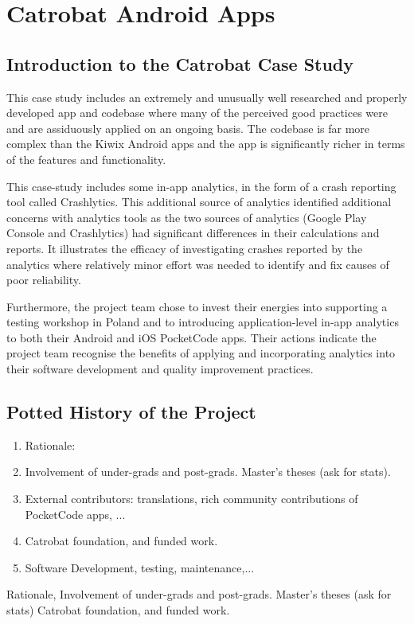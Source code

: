 \section{Catrobat Android Apps}
\subsection{Introduction to the Catrobat Case Study}
This case study includes an extremely and unusually well researched and properly developed app and codebase where many of the perceived good practices were and are assiduously applied on an ongoing basis. The codebase is far more complex than the Kiwix Android apps and the app is significantly richer in terms of the features and functionality.

This case-study includes some in-app analytics, in the form of a crash reporting tool called Crashlytics. This additional source of analytics identified additional concerns with analytics tools as the two sources of analytics (Google Play Console and Crashlytics) had significant differences in their calculations and reports. It illustrates the efficacy of investigating crashes reported by the analytics where relatively minor effort was needed to identify and fix causes of poor reliability.

Furthermore, the project team chose to invest their energies into supporting a testing workshop in Poland and to introducing application-level in-app analytics to both their Android and iOS PocketCode apps. Their actions indicate the project team recognise the benefits of applying and incorporating analytics into their software development and quality improvement practices.

\subsection{Potted History of the Project}
\begin{enumerate}
    \item Rationale:
    \item Involvement of under-grads and post-grads. Master's theses (ask for stats).
    \item External contributors: translations, rich community contributions of PocketCode apps, ...
    \item Catrobat foundation, and funded work.
    \item Software Development, testing, maintenance,...
\end{enumerate}
Rationale,
Involvement of under-grads and post-grads. Master's theses (ask for stats)
Catrobat foundation, and funded work.


